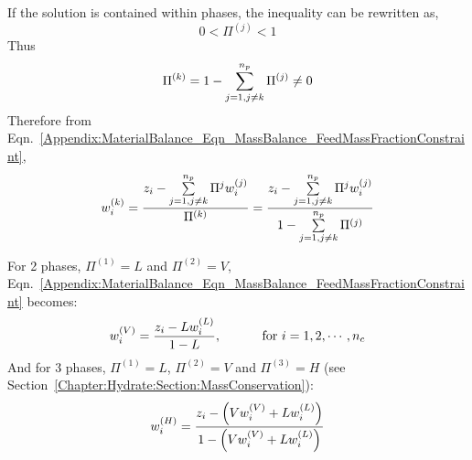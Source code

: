 If the solution is contained within  phases, the inequality can be rewritten as,
\begin{equation} 
0 < \Pi^{(j)} < 1
\end{equation}
Thus
\begin{displaymath}
\Pi^{(k)} = 1 - \summation_{j=1,j\neq k}^{n_{p}} \Pi^{(j)} \neq 0
\end{displaymath}
Therefore from Eqn.~\ref{Appendix:MaterialBalance_Eqn_MassBalance_FeedMassFractionConstraint},
\begin{equation}
w_{i}^{(k)} = \frc{z_{i}-\summation_{j=1,j\neq k}^{n_{p}}\Pi^{j}\mfr[w]{i}{j}}{\Pi^{(k)}} = \frc{z_{i} - \summation_{j=1,j\neq k}^{n_{p}}\Pi^{j}\mfr[w]{i}{j}}{1-\summation_{j=1,j\neq k}^{n_{p}}\Pi^{(j)}}
\label{Appendix:MaterialBalance_Eqn_MassBalance_FeedMassFractionConstraint2}
\end{equation}


\begin{shaded}\noindent
   For 2 phases, $\Pi^{(1)}=L$ and $\Pi^{(2)}=V$, Eqn.~\ref{Appendix:MaterialBalance_Eqn_MassBalance_FeedMassFractionConstraint} becomes:
     \begin{displaymath}
      \mfr[w]{i}{V} = \frc{z_{i}-L\mfr[w]{i}{L}}{1-L}, \hspace{1cm}\text{ for } i=1,2,\cdots,n_{c}
     \end{displaymath}
     And for 3 phases, $\Pi^{(1)}=L$, $\Pi^{(2)}=V$ and $\Pi^{(3)}=H$ (see Section~\ref{Chapter:Hydrate:Section:MassConservation}):
        \begin{displaymath}
           \mfr[w]{i}{H} = \frc{z_{i}-\left(V \mfr[w]{i}{V} + L \mfr[w]{i}{L}\right)}{1 - \left(V \mfr[w]{i}{V} + L \mfr[w]{i}{L}\right)}
        \end{displaymath}
\end{shaded}
